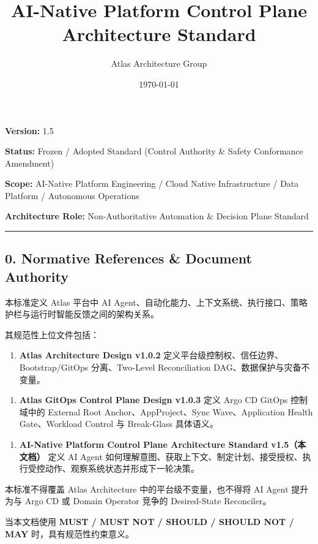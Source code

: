 \documentclass[11pt,a4paper]{article}
\title{\textbf{\Large AI-Native Platform Control Plane Architecture Standard}}
\author{Atlas Architecture Group}
\date{\today}
\begin{document}
\maketitle
\tableofcontents
\newpage

\textbf{Version:} 1.5

\textbf{Status:} Frozen / Adopted Standard (Control Authority \& Safety Conformance Amendment)

\textbf{Scope:} AI-Native Platform Engineering / Cloud Native Infrastructure / Data Platform / Autonomous Operations

\textbf{Architecture Role:} Non-Authoritative Automation \& Decision Plane Standard

\vspace{0.5em}\hrule\vspace{0.5em}
\subsection{0. Normative References \& Document Authority}
本标准定义 Atlas 平台中 AI Agent、自动化能力、上下文系统、执行接口、策略护栏与运行时智能反馈之间的架构关系。

其规范性上位文件包括：

\begin{enumerate}
  \item \textbf{Atlas Architecture Design v1.0.2}
定义平台级控制权、信任边界、Bootstrap/GitOps 分离、Two-Level Reconciliation DAG、数据保护与灾备不变量。

\end{enumerate}
\begin{enumerate}
  \item \textbf{Atlas GitOps Control Plane Design v1.0.3}
定义 Argo CD GitOps 控制域中的 External Root Anchor、AppProject、Sync Wave、Application Health Gate、Workload Control 与 Break-Glass 具体语义。

\end{enumerate}
\begin{enumerate}
  \item \textbf{AI-Native Platform Control Plane Architecture Standard v1.5（本文档）}
定义 AI Agent 如何理解意图、获取上下文、制定计划、接受授权、执行受控动作、观察系统状态并形成下一轮决策。

\end{enumerate}
本标准不得覆盖 Atlas Architecture 中的平台级不变量，也不得将 AI Agent 提升为与 Argo CD 或 Domain Operator 竞争的 Desired-State Reconciler。

当本文档使用 \textbf{MUST / MUST NOT / SHOULD / SHOULD NOT / MAY} 时，具有规范性约束意义。
\end{document}
